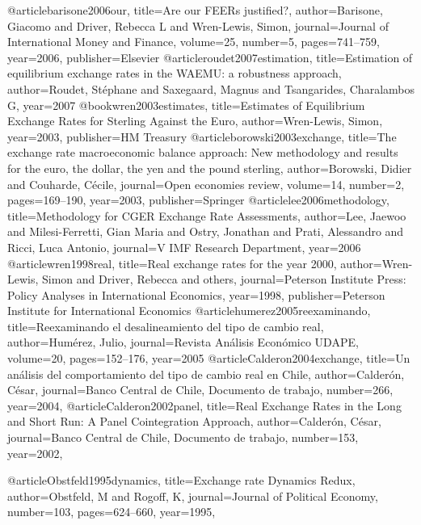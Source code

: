 @article{barisone2006our,	  
	title={Are our FEERs justified?},
	author={Barisone, Giacomo and Driver, Rebecca L and Wren-Lewis, Simon},
	journal={Journal of International Money and Finance},
	volume={25},
	number={5},
	pages={741--759},
	year={2006},
	publisher={Elsevier}
}
@article{roudet2007estimation,
	title={Estimation of equilibrium exchange rates in the WAEMU: a robustness approach},
	author={Roudet, St{\'e}phane and Saxegaard, Magnus and Tsangarides, Charalambos G},
	year={2007}
}					
@book{wren2003estimates,
	title={Estimates of Equilibrium Exchange Rates for Sterling Against the Euro},
	author={Wren-Lewis, Simon},
	year={2003},
	publisher={HM Treasury}
}				
@article{borowski2003exchange,
	title={The exchange rate macroeconomic balance approach: New methodology and results for the euro, the dollar, the yen and the pound sterling},
	author={Borowski, Didier and Couharde, C{\'e}cile},
	journal={Open economies review},
	volume={14},
	number={2},
	pages={169--190},
	year={2003},
	publisher={Springer}
}
@article{lee2006methodology,
	title={Methodology for CGER Exchange Rate Assessments},
	author={Lee, Jaewoo and Milesi-Ferretti, Gian Maria and Ostry, Jonathan and Prati, Alessandro and Ricci, Luca Antonio},	
	journal={V IMF Research Department},
	year={2006}
}				
@article{wren1998real,
	title={Real exchange rates for the year 2000},
	author={Wren-Lewis, Simon and Driver, Rebecca and others},
	journal={Peterson Institute Press: Policy Analyses in International Economics},
	year={1998},
	publisher={Peterson Institute for International Economics}
}			
@article{humerez2005reexaminando,
  title={Reexaminando el desalineamiento del tipo de cambio real},
  author={Hum{\'e}rez, Julio},
  journal={Revista An{\'a}lisis Econ{\'o}mico UDAPE},
  volume={20},
  pages={152--176},
  year={2005}
}
@article{Calderon2004exchange,
  title={Un an{\'a}lisis del comportamiento del tipo de cambio real en Chile},
  author={Calder{\'o}n, C{\'e}sar},
  journal={Banco Central de Chile, Documento de trabajo},
  number={266},
  year={2004},
}
@article{Calderon2002panel,
  title={Real Exchange Rates in the Long and Short Run: A Panel Cointegration Approach},
  author={Calder{\'o}n, C{\'e}sar},
  journal={Banco Central de Chile, Documento de trabajo},
  number={153},
  year={2002},
}

@article{Obstfeld1995dynamics,
  title={Exchange rate Dynamics Redux},
  author={Obstfeld, M and Rogoff, K},
  journal={Journal of Political Economy},
  number={103},
  pages={624--660},
  year={1995},
}
